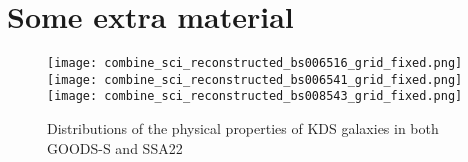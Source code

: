 \documentclass[a4paper,fleqn,usenatbib]{mn2e}
\begin{document}


%


\clearpage 

%




\appendix

\section{Some extra material}

\begin{figure*}
\centering
\texttt{[image: combine\_sci\_reconstructed\_bs006516\_grid\_fixed.png]}
\texttt{[image: combine\_sci\_reconstructed\_bs006541\_grid\_fixed.png]}
\texttt{[image: combine\_sci\_reconstructed\_bs008543\_grid\_fixed.png]}
\caption{Distributions of the physical properties of KDS galaxies in both GOODS-S and SSA22}
\label{fig:grids}
\end{figure*}



\bsp    %
\label{lastpage}
\end{document}
